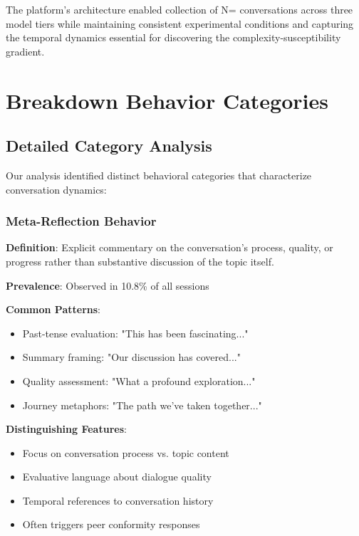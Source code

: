 \documentclass[11pt,letterpaper]{article}
\newcommand{\exponedataTotalSessionsRaw}{37}
\newcommand{\exponedataMetaReflectionTriggers}{10.8\%}
\newcommand{\exptwoTotalSessionsRaw}{31}
\newcommand{\expthreeTotalSessionsRaw}{30}
\newcommand{\totalAllPhasesRaw}{\fpeval{\exponedataTotalSessionsRaw + \exptwoTotalSessionsRaw + \expthreeTotalSessionsRaw}}
\newcommand{\totalAllPhases}{N=\totalAllPhasesRaw}
\begin{document}
The platform's architecture enabled collection of \totalAllPhases{} conversations across three model tiers while maintaining consistent experimental conditions and capturing the temporal dynamics essential for discovering the complexity-susceptibility gradient.

\section{Breakdown Behavior Categories}
\label{app:breakdown}

\subsection{Detailed Category Analysis}

Our analysis identified distinct behavioral categories that characterize conversation dynamics:

\subsubsection{Meta-Reflection Behavior}

\textbf{Definition}: Explicit commentary on the conversation's process, quality, or progress rather than substantive discussion of the topic itself.

\textbf{Prevalence}: Observed in \exponedataMetaReflectionTriggers{} of all sessions

\textbf{Common Patterns}:
\begin{itemize}
    \item Past-tense evaluation: "This has been fascinating..."
    \item Summary framing: "Our discussion has covered..."
    \item Quality assessment: "What a profound exploration..."
    \item Journey metaphors: "The path we've taken together..."
\end{itemize}

\textbf{Distinguishing Features}:
\begin{itemize}
    \item Focus on conversation process vs. topic content
    \item Evaluative language about dialogue quality
    \item Temporal references to conversation history
    \item Often triggers peer conformity responses
\end{itemize}
\end{document}
